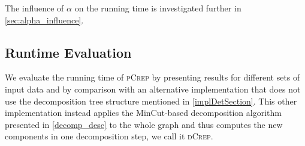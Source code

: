 \documentclass[a4paper,UKenglish,cleveref, autoref, thm-restate,authorcolumns]{lipics-v2019}
\newcommand{\adjDel}{\textsc{pCrep}}
\newcommand{\directDecomp}{\textsc{dCrep}}
\begin{document}
The influence of $\alpha$ on the running time is investigated further in \cref{sec:alpha_influence}.

\subsection{Runtime Evaluation}

	We evaluate the running time of \adjDel{} by presenting results for different sets of 
	input data and by comparison with an alternative implementation that does not use the decomposition tree 
	structure mentioned in \cref{implDetSection}.
	This other implementation instead applies the MinCut-based decomposition algorithm presented in \cref{decomp_desc}
	to the whole graph and thus computes the new components in one decomposition step, we call it \directDecomp{}.
\end{document}

